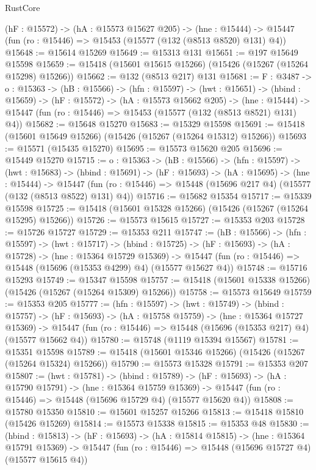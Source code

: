 \begin{lexlean}{RustCore}
\begin{coremodule}
  (hF : @15572) ->
  (hA : @15573 @15627 @205) ->
  (hne : @15444) -> @15447 (fun (ro : @15446) => @15453 (@15577 (@132 (@8513 @8520) @131) @4))
@15648 := @15614 @15269
@15649 := @15313 @131
@15651 := @197 @15649 @15598
@15659 := @15418 (@15601 @15615 @15266) (@15426 (@15267 (@15264 @15298) @15266))
@15662 := @132 (@8513 @217) @131
@15681 := {F : @3487} ->
  {o : @15363} ->
  (hB : @15566) ->
  (hfn : @15597) ->
  (hwt : @15651) ->
  (hbind : @15659) ->
  (hF : @15572) ->
  (hA : @15573 @15662 @205) ->
  (hne : @15444) -> @15447 (fun (ro : @15446) => @15453 (@15577 (@132 (@8513 @8521) @131) @4))
@15682 := @15648 @15270
@15683 := @15329 @15598
@15691 := @15418 (@15601 @15649 @15266) (@15426 (@15267 (@15264 @15312) @15266))
@15693 := @15571 (@15435 @15270)
@15695 := @15573 @15620 @205
@15696 := @15449 @15270
@15715 := {o : @15363} ->
  (hB : @15566) ->
  (hfn : @15597) ->
  (hwt : @15683) ->
  (hbind : @15691) ->
  (hF : @15693) ->
  (hA : @15695) ->
  (hne : @15444) ->
  @15447 (fun (ro : @15446) => @15448 (@15696 @217 @4) (@15577 (@132 (@8513 @8522) @131) @4))
@15716 := @15682 @15354
@15717 := @15339 @15598
@15725 := @15418 (@15601 @15328 @15266) (@15426 (@15267 (@15264 @15295) @15266))
@15726 := @15573 @15615
@15727 := @15353 @203
@15728 := @15726 @15727
@15729 := @15353 @211
@15747 := (hB : @15566) ->
  (hfn : @15597) ->
  (hwt : @15717) ->
  (hbind : @15725) ->
  (hF : @15693) ->
  (hA : @15728) ->
  (hne : @15364 @15729 @15369) ->
  @15447 (fun (ro : @15446) => @15448 (@15696 (@15353 @4299) @4) (@15577 @15627 @4))
@15748 := @15716 @15293
@15749 := @15347 @15598
@15757 := @15418 (@15601 @15338 @15266) (@15426 (@15267 (@15264 @15309) @15266))
@15758 := @15573 @15649
@15759 := @15353 @205
@15777 := (hfn : @15597) ->
  (hwt : @15749) ->
  (hbind : @15757) ->
  (hF : @15693) ->
  (hA : @15758 @15759) ->
  (hne : @15364 @15727 @15369) ->
  @15447 (fun (ro : @15446) => @15448 (@15696 (@15353 @217) @4) (@15577 @15662 @4))
@15780 := @15748 (@1119 @15394 @15567)
@15781 := @15351 @15598
@15789 := @15418 (@15601 @15346 @15266) (@15426 (@15267 (@15264 @15324) @15266))
@15790 := @15573 @15328
@15791 := @15353 @207
@15807 := (hwt : @15781) ->
  (hbind : @15789) ->
  (hF : @15693) ->
  (hA : @15790 @15791) ->
  (hne : @15364 @15759 @15369) ->
  @15447 (fun (ro : @15446) => @15448 (@15696 @15729 @4) (@15577 @15620 @4))
@15808 := @15780 @15350
@15810 := @15601 @15257 @15266
@15813 := @15418 @15810 (@15426 @15269)
@15814 := @15573 @15338
@15815 := @15353 @48
@15830 := (hbind : @15813) ->
  (hF : @15693) ->
  (hA : @15814 @15815) ->
  (hne : @15364 @15791 @15369) ->
  @15447 (fun (ro : @15446) => @15448 (@15696 @15727 @4) (@15577 @15615 @4))

\end{coremodule}
\end{lexlean}
